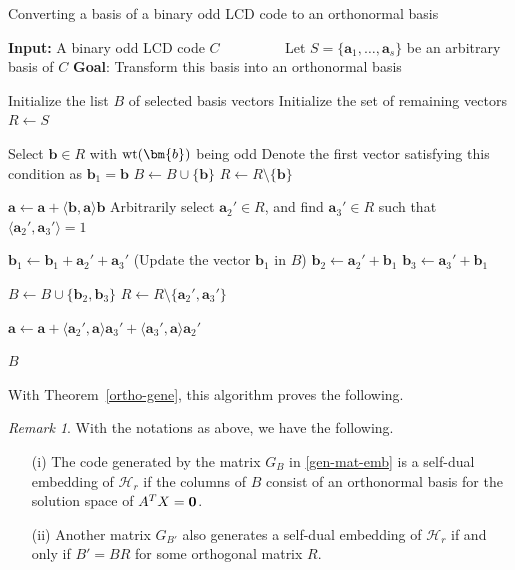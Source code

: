 \documentclass{article}
\theoremstyle{definition}
\theoremstyle{remark}
\newtheorem{remark}{Remark}
\begin{document}
\begin{algorithm}[!htb]
  \caption{Converting a basis of a binary odd LCD code to an orthonormal basis}
  \label{alg-ortho}
  \begin{algorithmic}[1]
      \State \textbf{Input:} A binary odd LCD code $ C $
      \State ~~~~~~~~ Let $ S = \{\bm{a}_1, \ldots, \bm{a}_s\} $ be an arbitrary basis of $ C $
      \State \textbf{Goal}: Transform this basis into an orthonormal basis

          \State Initialize the list $B$ of selected basis vectors
          \State Initialize the set of remaining vectors $ R \gets S $

                  \State Select $ \bm{b} \in R $ with $ {\rm wt}(\bm{b}) $ being odd
                  \State Denote the first vector satisfying this condition as $ \bm{b}_1 = \bm{b} $
                  \State $ B \gets B \cup \{\bm{b}\} $
                  \State $ R \gets R \setminus \{\bm{b}\} $

                      \State $ \bm{a} \gets \bm{a} + \langle \bm{b}, \bm{a} \rangle \bm{b} $
                  \EndFor
              \Else
                  \State Arbitrarily select $ \bm{a}_2' \in R $, and find $ \bm{a}_3' \in R $ such that $ \langle \bm{a}_2', \bm{a}_3' \rangle = 1 $

                  \State $ \bm{b}_1 \gets \bm{b}_1 + \bm{a}_2' + \bm{a}_3' $ (Update the vector $ \bm{b}_1 $ in $ B $)
                  \State $ \bm{b}_2 \gets \bm{a}_2' + \bm{b}_1 $
                  \State $ \bm{b}_3 \gets \bm{a}_3' + \bm{b}_1 $

                  \State $ B \gets B \cup \{\bm{b}_2, \bm{b}_3\} $
                  \State $ R \gets R \setminus \{\bm{a}_2', \bm{a}_3'\} $

                       \State $\bm{a} \gets \bm{a} + \langle \bm{a}_2', \bm{a} \rangle \bm{a}_3' + \langle \bm{a}_3', \bm{a} \rangle \bm{a}_2' $
                  \EndFor
              \EndIf
          \EndWhile

          \State \Return $B$
      \EndProcedure
  \end{algorithmic}
\end{algorithm}

With Theorem~\ref{ortho-gene}, this algorithm proves the following.
\begin{remark}\label{HammingAlg}
With the notations as above, we have the following.
\begin{enumerate}
    \item[(i)] The code generated by the matrix $G_B$ in \eqref{gen-mat-emb} is a self-dual embedding of $\mathcal{H}_r$ if the columns of $B$ consist of an orthonormal basis for the solution space of $A^TX={\bf 0}$.
    \item [(ii)] Another matrix $G_{B'}$ also generates a  self-dual embedding of $\mathcal{H}_r$  if and only if $B'=BR$ for some orthogonal matrix $R$.
\end{enumerate}
\end{remark}
\end{document}
